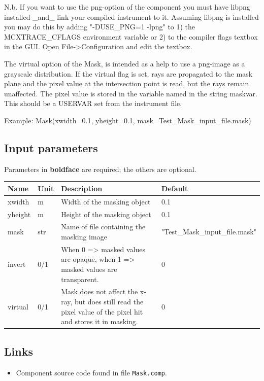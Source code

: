 N.b. If you want to use the png-option of the component you must have libpng installed \_and\_ link your compiled instrument to it. Assuming libpng is installed you may do this by adding "-DUSE\_PNG=1 -lpng" to 1) the MCXTRACE\_CFLAGS environment variable or 2) to the compiler flags textbox in the GUI. Open File-\textgreater{}Configuration and edit the textbox.

The virtual option of the Mask, is intended as a help to use a png-image as a grayscale distribution. If the virtual flag is set, rays are propagated to the mask plane and the pixel value at the intersection point is read, but the rays remain unaffected. The pixel value is stored in the variable named in the string maskvar. This should be a USERVAR set from the instrument file.

Example: Mask(xwidth=0.1, yheight=0.1, mask=Test\_Mask\_input\_file.mask)

\subsection*{Input parameters}
Parameters in \textbf{boldface} are required; the others are optional.

\begin{longtable}{p{}p{}p{}p{}}
\toprule
\textbf{Name} & \textbf{Unit} & \textbf{Description} & \textbf{Default} \\
\midrule
\endhead
xwidth & m & Width of the masking object & 0.1 \\
yheight & m & Height of the masking object & 0.1 \\
mask & str & Name of file containing the masking image & "Test\_Mask\_input\_file.mask" \\
invert & 0/1 & When 0 =\textgreater{} masked values are opaque, when 1 =\textgreater{} masked values are transparent. & 0 \\
virtual & 0/1 & Mask does not affect the x-ray, but does still read the pixel value of the pixel hit and stores it in masking. & 0 \\
\bottomrule
\end{longtable}

\subsection*{Links}
\begin{itemize}
  \item Component source code found in file \texttt{Mask.comp}.
\end{itemize}
